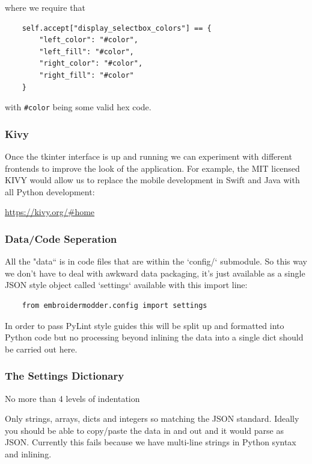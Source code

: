 \documentclass[a4paper, 11pt]{report}
\begin{document}
where we require that

\begin{verbatim}
    self.accept["display_selectbox_colors"] == {
        "left_color": "#color",
        "left_fill": "#color",
        "right_color": "#color",
        "right_fill": "#color"
    }
\end{verbatim}

with \texttt{\#color} being some valid hex code.

\subsubsection{Kivy}

Once the tkinter interface is up and running we can experiment
with different frontends to improve the look of the application.
For example, the MIT licensed KIVY would allow us to replace the 
mobile development in Swift and Java with all Python development:

\url{https://kivy.org/#home}

\subsubsection{Data/Code Seperation}

All the "data`` is in code files that are within the `config/`
submodule. So this way we don't have to deal with awkward data
packaging, it's just available as a single JSON style object
called `settings` available with this import line:

\begin{verbatim}
    from embroidermodder.config import settings
\end{verbatim}

In order to pass PyLint style guides this will be split up and
formatted into Python code but no processing beyond inlining
the data into a single dict should be carried out here.

\subsubsection{The Settings Dictionary}

No more than 4 levels of indentation

Only strings, arrays, dicts and integers so matching the JSON standard. Ideally you should be able to copy/paste the data in and out and it would parse as JSON. Currently this fails because we have multi-line strings in Python syntax and inlining.
\end{document}
